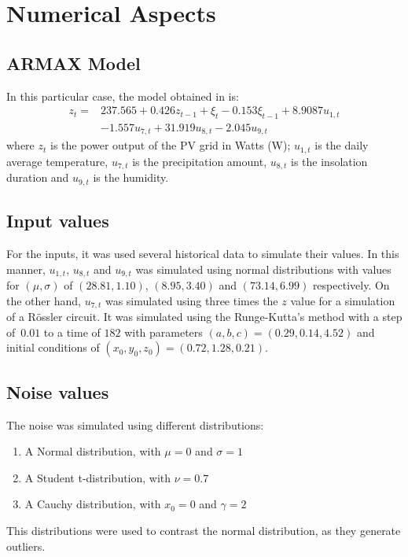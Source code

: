 \section{Numerical Aspects}\label{sec:numAsp}
\subsection{ARMAX Model}
In this particular case, the model obtained in \cite{li2014armax} is:
\begin{equation}
\begin{aligned} z_{t}=& 237.565+0.426z_{t-1}+\xi_{t}-0.153 \xi_{t-1}+8.9087u_{1, t} \\ &-1.557 u_{7, t}+31.919 u_{8, t}-2.045u_{9, t}
\end{aligned}
\end{equation}
where $z_t$ is the power output of the PV grid in Watts (W); $u_{1,t}$ is the daily average temperature, $u_{7,t}$ is the precipitation amount, $u_{8,t}$ is the insolation duration and $u_{9,t}$ is the humidity.

\subsection{Input values}
For the inputs, it was used several historical data to simulate their values. In this manner, $u_{1,t}$, $u_{8,t}$ and $u_{9,t}$ was simulated using normal distributions with values for $(\mu, \sigma)$ of $(28.81, 1.10)$, $(8.95, 3.40)$ and $(73.14, 6.99)$ respectively. On the other hand, $u_{7,t}$ was simulated using three times the $z$ value for a simulation of a Rössler circuit. It was simulated using the Runge-Kutta's method with a step of~$0.01$ to a time of $182$ with parameters $(a, b, c) = (0.29, 0.14, 4.52)$ and initial conditions of $(x_0, y_0, z_0) = (0.72, 1.28, 0.21)$.

\subsection{Noise values}
The noise was simulated using different distributions:
\begin{enumerate}
  \item A Normal distribution, with $\mu = 0$ and $\sigma = 1$
  \item A Student t-distribution, with $\nu = 0.7$
  \item A Cauchy distribution, with $x_0 = 0$ and $\gamma = 2$
  \end{enumerate}

This distributions were used to contrast the normal distribution, as they generate outliers.